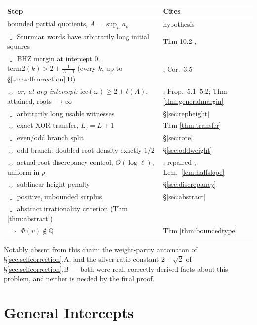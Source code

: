 \documentclass[11pt]{article}
\newcommand{\Q}{\mathbb{Q}}
\begin{document}
\begin{center}
\begin{tabular}{ll}
\toprule
Step & Cites \\
\midrule
bounded partial quotients, $A=\sup_n a_n$ & hypothesis \\
$\downarrow$ Sturmian words have arbitrarily long initial squares & Thm 10.2 \cite{DeJesus2026Sturmian}, \cite{ADQZ2001} \\
$\downarrow$ BHZ margin at intercept $0$, $\text{term2}(k)>2+\tfrac1{A+1}$ (every $k$, up to \S\ref{sec:selfcorrection}.D) & \cite{BHZ2006}, Cor.\ 3.5 \\
$\downarrow$ \emph{or, at any intercept:} $\text{ice}(\omega)\ge2+\delta(A)$, attained, roots $\to\infty$ & \cite{BHZ2006}, Prop.\ 5.1--5.2; Thm \ref{thm:generalmargin} \\
$\downarrow$ arbitrarily long usable witnesses & \S\ref{sec:repheight} \\
$\downarrow$ exact XOR transfer, $L_v=L+1$ & Thm \ref{thm:transfer} \cite{Phase2Transfer,Phase5Transfer} \\
$\downarrow$ even/odd branch split & \S\ref{sec:rote} \\
$\downarrow$ odd branch: doubled root density exactly $1/2$ & \S\ref{sec:oddweight} \cite{Phase4Required} \\
$\downarrow$ actual-root discrepancy control, $O(\log\ell)$, uniform in $\rho$ & \cite{Phase2Discrepancy}, repaired \cite{Phase5Hostile}, Lem.\ \ref{lem:halfslope} \\
$\downarrow$ sublinear height penalty & \S\ref{sec:discrepancy} \\
$\downarrow$ positive, unbounded surplus & \S\ref{sec:abstract} \\
$\downarrow$ abstract irrationality criterion (Thm \ref{thm:abstract}) & \cite{Phase2Abstract} \\
$\Rightarrow$ $\Phi(v)\notin\Q$ & Thm \ref{thm:boundedtype} \\
\bottomrule
\end{tabular}
\end{center}

Notably absent from this chain: the weight-parity automaton of \S\ref{sec:selfcorrection}.A, and the silver-ratio constant $2+\sqrt2$ of \S\ref{sec:selfcorrection}.B --- both were real, correctly-derived facts about this problem, and neither is needed by the final proof.

\section{General Intercepts}
\label{sec:generalintercept}
\end{document}
